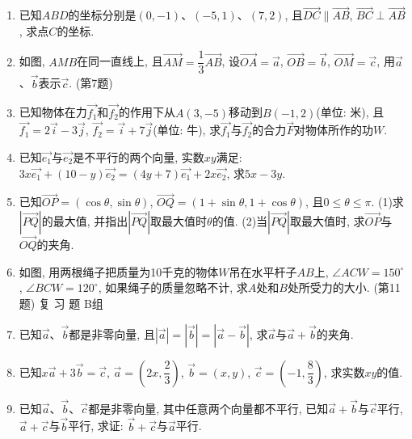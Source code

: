 \documentclass[10pt,a4paper]{article}
\begin{document}
\begin{enumerate}[1.]
\item 已知$ABD$的坐标分别是$(0,-1)$、$(-5,1)$、$(7,2)$, 且$\overrightarrow {DC}\parallel \overrightarrow {AB}$, $\overrightarrow {BC}\perp \overrightarrow {AB}$, 求点$C$的坐标.
\item 如图, $AMB$在同一直线上, 且$\overrightarrow {AM}=\dfrac 13\overrightarrow {AB}$, 设$\overrightarrow {OA}=\overrightarrow a$, $\overrightarrow {OB}=\overrightarrow b$, $\overrightarrow {OM}=\overrightarrow c$, 用$\overrightarrow a$、$\overrightarrow b$表示$\overrightarrow c$.
(第7题)
\item 已知物体在力$\overrightarrow {f_1}$和$\overrightarrow {f_2}$的作用下从$A(3,-5)$移动到$B(-1,2)$(单位: 米), 且$\overrightarrow {f_1}=2\overrightarrow i-3\overrightarrow j$, $\overrightarrow {f_2}=\overrightarrow i+7\overrightarrow j$(单位: 牛), 求$\overrightarrow {f_1}$与$\overrightarrow {f_2}$的合力$\overrightarrow F$对物体所作的功$W$.
\item 已知$\overrightarrow {e_1}$与$\overrightarrow {e_2}$是不平行的两个向量, 实数$xy$满足: $3x\overrightarrow {e_1}+(10-y)\overrightarrow {e_2}=(4y+7)\overrightarrow {e_1}+2x\overrightarrow {e_2}$, 求$5x-3y$.
\item 已知$\overrightarrow {OP}=(\cos \theta ,\sin \theta)$, $\overrightarrow {OQ}=(1+\sin \theta ,1+\cos \theta)$, 且$0\le \theta \le \pi$.
(1)求$|\overrightarrow {PQ}|$的最大值, 并指出$|\overrightarrow {PQ}|$取最大值时$\theta$的值.
(2)当$|\overrightarrow {PQ}|$取最大值时, 求$\overrightarrow {OP}$与$\overrightarrow {OQ}$的夹角.
\item 如图, 用两根绳子把质量为10千克的物体$W$吊在水平杆子$AB$上, $\angle ACW=150^{\circ }$, $\angle BCW=120^{\circ }$, 如果绳子的质量忽略不计, 求$A$处和$B$处所受力的大小.
(第11题)
复 习 题
B组
\item 已知$\overrightarrow a$、$\overrightarrow b$都是非零向量, 且$|\overrightarrow a|=|\overrightarrow b|=|\overrightarrow a-\overrightarrow b|$, 求$\overrightarrow a$与$\overrightarrow a+\overrightarrow b$的夹角.
\item 已知$x\overrightarrow a+3\overrightarrow b=\overrightarrow c$, $\overrightarrow a=(2x,\dfrac 23)$, $\overrightarrow b=(x,y)$, $\overrightarrow c=(-1,\dfrac 83)$, 求实数$xy$的值.
\item 已知$\overrightarrow a$、$\overrightarrow b$、$\overrightarrow c$都是非零向量, 其中任意两个向量都不平行, 已知$\overrightarrow a+\overrightarrow b$与$\overrightarrow c$平行, $\overrightarrow a+\overrightarrow c$与$\overrightarrow b$平行, 求证: $\overrightarrow b+\overrightarrow c$与$\overrightarrow a$平行.

\end{enumerate}
\end{document}
